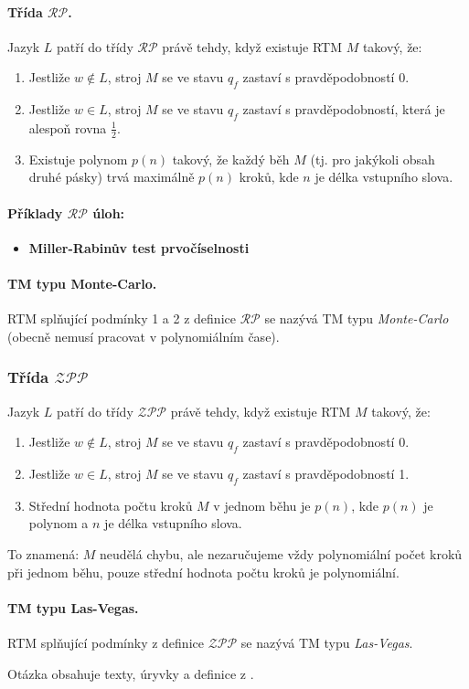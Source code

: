 \paragraph{Třída $\mathcal{RP}$.} Jazyk $L$ patří do třídy $\mathcal{RP}$ právě tehdy, když existuje RTM $M$ takový, že:

\begin{enumerate}
    \item Jestliže $w \notin L$, stroj $M$ se ve stavu $q_f$ zastaví s pravděpodobností 0.
    \item Jestliže $w \in L$, stroj $M$ se ve stavu $q_f$ zastaví s pravděpodobností, která je alespoň rovna $\frac{1}{2}$.
    \item Existuje polynom $p(n)$ takový, že každý běh $M$ (tj. pro jakýkoli obsah druhé pásky) trvá maximálně $p(n)$ kroků, kde $n$ je délka vstupního slova.
\end{enumerate}

\paragraph{Příklady $\mathcal{RP}$ úloh:}
\begin{itemize}[itemsep=0pt]
    \item \textbf{\color{darkBrown}Miller-Rabinův test prvočíselnosti}
\end{itemize}

\paragraph{TM typu Monte-Carlo.} RTM splňující podmínky 1 a 2 z definice $\mathcal{RP}$ se nazývá TM typu \textit{Monte-Carlo} (obecně nemusí pracovat v polynomiálním čase).

\subsubsection*{Třída $\mathcal{ZPP}$} Jazyk $L$ patří do třídy $\mathcal{ZPP}$ právě tehdy, když existuje RTM $M$ takový, že:

\begin{enumerate}
    \item Jestliže $w \notin L$, stroj $M$ se ve stavu $q_f$ zastaví s pravděpodobností 0.
    \item Jestliže $w \in L$, stroj $M$ se ve stavu $q_f$ zastaví s pravděpodobností 1.
    \item Střední hodnota počtu kroků $M$ v jednom běhu je $p(n)$, kde $p(n)$ je polynom a $n$ je délka vstupního slova.
\end{enumerate}

To znamená: $M$ neudělá chybu, ale nezaručujeme vždy polynomiální počet kroků při jednom běhu, pouze střední hodnota počtu kroků je polynomiální.

\paragraph{TM typu Las-Vegas.} RTM splňující podmínky z definice $\mathcal{ZPP}$ se nazývá TM typu \textit{Las-Vegas}.

Otázka obsahuje texty, úryvky a definice z \cite{tal:demlova}.
